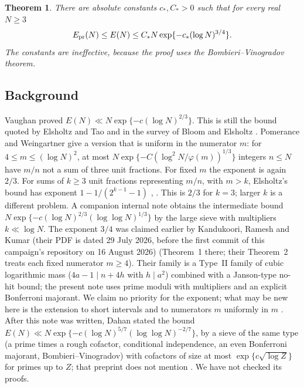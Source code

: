 \documentclass[10pt,reqno]{amsart}
\newtheorem{theorem}{Theorem}[section]
\theoremstyle{remark}
\begin{document}
\begin{theorem}\label{thm:main}
There are absolute constants $c_*,C_*>0$ such that for every real $N\geq3$
\[
 E_{\rm pr}(N)\leq E(N)\leq C_*N\exp\{-c_*(\log N)^{3/4}\}.
\]
The constants are ineffective, because the proof uses the
Bombieri--Vinogradov theorem.
\end{theorem}

\subsection*{Background}
Vaughan \cite{Vaughan} proved $E(N)\ll N\exp\{-c(\log N)^{2/3}\}$.  This
is still the bound quoted by Elsholtz and Tao \cite[\S1]{ET} and in the
survey of Bloom and Elsholtz \cite{BE}.  Pomerance and Weingartner
\cite[Thm.~1.3]{PW} give a version that is uniform in the numerator $m$:
for $4\leq m\leq(\log N)^2$, at most $N\exp\{-C(\log^2N/\varphi(m))^{1/3}\}$
integers $n\leq N$ have $m/n$ not a sum of three unit fractions.  For fixed
$m$ the exponent is again $2/3$.
For sums of $k\geq3$ unit fractions representing $m/n$, with $m>k$,
Elsholtz's bound has exponent $1-1/(2^{k-1}-1)$ \cite{Elsholtz},
\cite[\S on exceptional sets]{BE}.  This is $2/3$ for $k=3$; larger $k$ is
a different problem.  A companion internal note \cite{LL} obtains the
intermediate bound $N\exp\{-c(\log N)^{2/3}(\log\log N)^{1/3}\}$ by the
large sieve with multipliers $k\ll\log N$.  The exponent $3/4$ was claimed
earlier by Kandukoori, Ramesh and Kumar \cite{KRK} (their PDF is dated
29 July 2026, before the first commit of this campaign's repository on
16 August 2026)
(Theorem~1 there; their Theorem~2 treats each fixed numerator $m\geq4$).
Their family is a Type~II family of cubic logarithmic mass
($4a-1\mid n+4h$ with $h\mid a^2$) combined with a Janson-type no-hit bound;
the present note uses prime moduli with multipliers and an explicit
Bonferroni majorant.  We claim no priority for the exponent; what may be
new here is the extension to short intervals and to numerators $m$
uniformly in $m$ \cite{MN}.
After this note was written, Dahan \cite{DahanII} stated the bound
$E(N)\ll N\exp\{-c(\log N)^{5/7}(\log\log N)^{-2/7}\}$, by a sieve of the
same type (a prime times a rough cofactor, conditional independence,
an even Bonferroni majorant, Bombieri--Vinogradov) with cofactors of size
at most $\exp\{c\sqrt{\log Z}\}$ for primes up to $Z$; that preprint does
not mention \cite{KRK}.  We have not checked its proofs.
\end{document}
